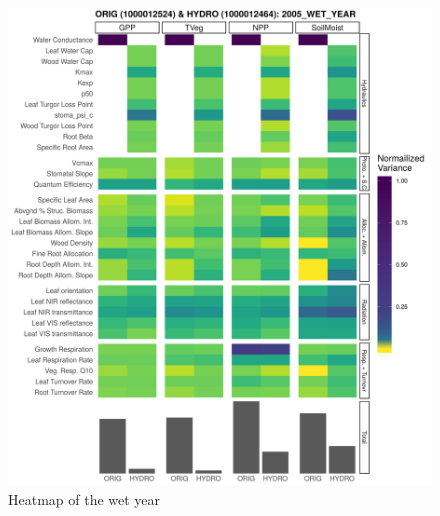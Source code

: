 \begin{figure}[h]
    \centering
    \includegraphics[width=.75\textheight]{Hydro_Paper_LaTeX/Hydro_Paper_Figures/heatmap_bar_wet_year.png}
    \caption[Heatmap of the wet year]{Heatmap of the wet year}
    \label{fig:heatmap_wet}
\end{figure}